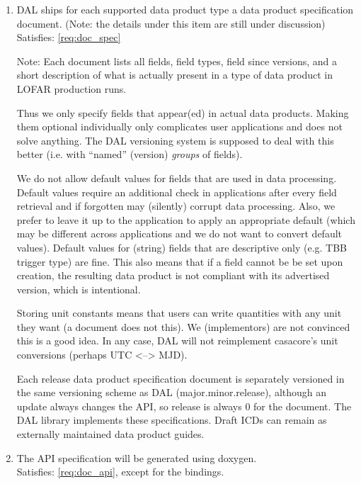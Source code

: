 \documentclass[a4paper,11pt]{article}
\begin{document}
\begin{enumerate}[resume, label=\it D.\arabic{*}]
\itemsep0em

\item \label{dsg:spec_docs} DAL ships for each supported data product type a data product specification document. (Note: the details under this item are still under discussion)\\
Satisfies: \ref{req:doc_spec}

Note: Each document lists all fields, field types, field since versions, and a short description of what is actually present in a type of data product in LOFAR production runs.

Thus we only specify fields that appear(ed) in actual data products.
Making them optional individually only complicates user applications and does not solve anything.
The DAL versioning system is supposed to deal with this better (i.e. with ``named'' (version) \emph{groups} of fields).

We do not allow default values for fields that are used in data processing.
Default values require an additional check in applications after every field retrieval and if forgotten may (silently) corrupt data processing.
Also, we prefer to leave it up to the application to apply an appropriate default (which may be different across applications and we do not want to convert default values).
Default values for (string) fields that are descriptive only (e.g. TBB trigger type) are fine.
This also means that if a field cannot be be set upon creation, the resulting data product is not compliant with its advertised version, which is intentional.

Storing unit constants means that users can write quantities with any unit they want (a document does not this).
We (implementors) are not convinced this is a good idea.
In any case, DAL will not reimplement casacore's unit conversions (perhaps UTC <--> MJD).

Each release data product specification document is separately versioned in the same versioning scheme as DAL (major.minor.release), although an update always changes the API, so release is always 0 for the document.
The DAL library implements these specifications.
Draft ICDs can remain as externally maintained data product guides.

\item \label{dsg:api_docs} The API specification will be generated using doxygen.\\
Satisfies: \ref{req:doc_api}, except for the bindings.


\end{enumerate}
\end{document}
